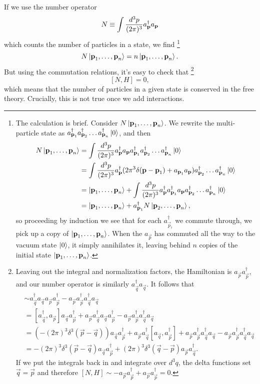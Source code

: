 If we use the number operator
$$N\equiv \int \frac{d^3p}{(2\pi)^3} a_{\boldsymbol{\mathbf{p}}}^\dagger a_{\boldsymbol{\mathbf{p}}}$$
which counts the number of particles in a state, we find%
    \footnote{The calculation is brief. Consider $N\left| \boldsymbol{\mathbf{p}}_1, \ldots ,\boldsymbol{\mathbf{p}}_n \right>$. We rewrite the multi-particle state as $a_{\boldsymbol{\mathbf{p}}_1}^\dagger a_{\boldsymbol{\mathbf{p}}_2}^\dagger \ldots a_{\boldsymbol{\mathbf{p}}_n}^\dagger \left| 0 \right>$, and then
    \begin{align*}
        N\left| \boldsymbol{\mathbf{p}}_1, \ldots ,\boldsymbol{\mathbf{p}}_n \right>&=\int \frac{d^3p}{(2\pi)^3} a_{\boldsymbol{\mathbf{p}}}^\dagger a_{\boldsymbol{\mathbf{p}}} a_{\boldsymbol{\mathbf{p}}_1}^\dagger a_{\boldsymbol{\mathbf{p}}_2}^\dagger \ldots a_{\boldsymbol{\mathbf{p}}_n}^\dagger \left| 0 \right>\\
        &=\int \frac{d^3p}{(2\pi)^3} a_{\boldsymbol{\mathbf{p}}}^\dagger (2\pi^3 \delta(\boldsymbol{\mathbf{p}} - \boldsymbol{\mathbf{p}}_1)+a_{\boldsymbol{\mathbf{p}}_1} a_{\boldsymbol{\mathbf{p}}})a_{\boldsymbol{\mathbf{p}}_2}^\dagger \ldots a_{\boldsymbol{\mathbf{p}}_n}^\dagger \left| 0 \right>\\
        &=\left| \boldsymbol{\mathbf{p}}_1, \ldots,\boldsymbol{\mathbf{p}}_n \right>+\int \frac{d^3p}{(2\pi)^3} a_{\boldsymbol{\mathbf{p}}}^\dagger  a_{\boldsymbol{\mathbf{p}}_1}^\dagger a_{\boldsymbol{\mathbf{p}}} a_{\boldsymbol{\mathbf{p}}_2}^\dagger \ldots a_{\boldsymbol{\mathbf{p}}_n}^\dagger \left| 0 \right>\\
        &=\left| \boldsymbol{\mathbf{p}}_1, \ldots,\boldsymbol{\mathbf{p}}_n \right>+a_{\boldsymbol{\mathbf{p}}_1}^\dagger N \left| \boldsymbol{\mathbf{p}}_2, \ldots, \boldsymbol{\mathbf{p}}_n \right>,
    \end{align*}
    so proceeding by induction we see that for each $a_{\vec p_i}^\dagger$ we commute through, we pick up a copy of $\left| \boldsymbol{\mathbf{p}}_1,\ldots, \boldsymbol{\mathbf{p}}_n \right>$. When the $a_{\vec p}$ has commuted all the way to the vacuum state $\left| 0 \right>$, it simply annihilates it, leaving behind $n$ copies of the initial state $\left| \boldsymbol{\mathbf{p}}_1,\ldots, \boldsymbol{\mathbf{p}}_n \right>$.}
$$N\left| \boldsymbol{\mathbf{p}}_1, \ldots ,\boldsymbol{\mathbf{p}}_n \right>=n \left| \boldsymbol{\mathbf{p}}_1, \ldots ,\boldsymbol{\mathbf{p}}_n \right>.$$
But using the commutation relations, it's easy to check that%
    \footnote{Leaving out the integral and normalization factors, the Hamiltonian is $a_{\vec p} a_{\vec p}^\dagger$, and our number operator is similarly $a_{\vec q}^\dagger a_{\vec q}.$ It follows that 
    \begin{align*}
        [N,H]&\sim a_{\vec q}^\dagger a_{\vec q}a_{\vec p} a_{\vec p}^\dagger -a_{\vec p} a_{\vec p}^\dagger a_{\vec q}^\dagger a_{\vec q}\\
        &=[a_{\vec q}^\dagger, a_{\vec p}]a_{\vec q} a_{\vec p}^\dagger+a_{\vec p} a_{\vec q}^\dagger a_{\vec q} a_{\vec p}^\dagger -a_{\vec p} a_{\vec p}^\dagger a_{\vec q}^\dagger a_{\vec q}\\
        &=(-(2\pi)^3 \delta^3(\vec p-\vec q))a_{\vec q} a_{\vec p}^\dagger +a_{\vec p} a_{\vec q}^\dagger [a_{\vec q},a_{\vec p}^\dagger] +a_{\vec p} a_{\vec p}^\dagger a_{\vec q}^\dagger a_{\vec q}-a_{\vec p} a_{\vec p}^\dagger a_{\vec q}^\dagger a_{\vec q}\\
        &=-(2\pi)^3 \delta^3(\vec p-\vec q) a_{\vec q} a_{\vec p}^\dagger+(2\pi)^3 \delta^3(\vec q-\vec p) a_{\vec p} a_{\vec q}^\dagger.
    \end{align*}
    If we put the integrals back in and integrate over $d^3q$, the delta functions set $\vec q = \vec p$ and therefore $[N,H]\sim -a_{\vec p} a_{\vec p}^\dagger +a_{\vec p} a_{\vec p}^\dagger =0$.}
$$[N,H]=0,$$
which means that the number of particles in a given state is conserved in the free theory. Crucially, this is not true once we add interactions.

